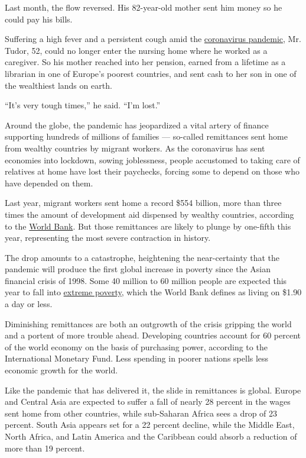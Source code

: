 Last month, the flow reversed. His 82-year-old mother sent him money so
he could pay his bills.

Suffering a high fever and a persistent cough amid the
\href{https://www.nytimes.com/2020/07/28/us/politics/coronavirus-hunger-poverty.html}{coronavirus
pandemic}, Mr. Tudor, 52, could no longer enter the nursing home where
he worked as a caregiver. So his mother reached into her pension, earned
from a lifetime as a librarian in one of Europe's poorest countries, and
sent cash to her son in one of the wealthiest lands on earth.

``It's very tough times,'' he said. ``I'm lost.''

Around the globe, the pandemic has jeopardized a vital artery of finance
supporting hundreds of millions of families --- so-called remittances
sent home from wealthy countries by migrant workers. As the coronavirus
has sent economies into lockdown, sowing joblessness, people accustomed
to taking care of relatives at home have lost their paychecks, forcing
some to depend on those who have depended on them.

Last year, migrant workers sent home a record \$554 billion, more than
three times the amount of development aid dispensed by wealthy
countries, according to the
\href{https://www.worldbank.org/en/news/press-release/2020/04/22/world-bank-predicts-sharpest-decline-of-remittances-in-recent-history}{World
Bank}. But those remittances are likely to plunge by one-fifth this
year, representing the most severe contraction in history.

The drop amounts to a catastrophe, heightening the near-certainty that
the pandemic will produce the first global increase in poverty since the
Asian financial crisis of 1998. Some 40 million to 60 million people are
expected this year to fall into
\href{https://www.worldbank.org/en/topic/poverty/overview}{extreme
poverty}, which the World Bank defines as living on \$1.90 a day or
less.

Diminishing remittances are both an outgrowth of the crisis gripping the
world and a portent of more trouble ahead. Developing countries account
for 60 percent of the world economy on the basis of purchasing power,
according to the International Monetary Fund. Less spending in poorer
nations spells less economic growth for the world.

Like the pandemic that has delivered it, the slide in remittances is
global. Europe and Central Asia are expected to suffer a fall of nearly
28 percent in the wages sent home from other countries, while
sub-Saharan Africa sees a drop of 23 percent. South Asia appears set for
a 22 percent decline, while the Middle East, North Africa, and Latin
America and the Caribbean could absorb a reduction of more than 19
percent.

